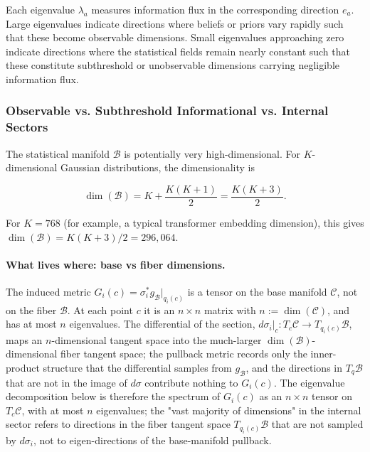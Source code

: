 \documentclass[11pt]{article}
\begin{document}
Each eigenvalue $\lambda_a$ measures information flux in the corresponding direction $e_a$. Large eigenvalues indicate directions where beliefs or priors vary rapidly such that these become observable dimensions. Small eigenvalues approaching zero indicate directions where the statistical fields remain nearly constant such that these constitute subthreshold or unobservable dimensions carrying negligible information flux.

\subsubsection{Observable vs. Subthreshold Informational vs. Internal Sectors}

The statistical manifold $\mathcal{B}$ is potentially very high-dimensional. For $K$-dimensional Gaussian distributions, the dimensionality is

\begin{equation}
\dim(\mathcal{B}) = K + \frac{K(K+1)}{2} = \frac{K(K+3)}{2}.
\end{equation}

For $K=768$ (for example, a typical transformer embedding dimension), this gives $\dim(\mathcal{B}) = K(K+3)/2 = 296{,}064$.

\paragraph{What lives where: base vs fiber dimensions.} The induced metric $G_i(c) = \sigma_i^* g_{\mathcal{B}}|_{q_i(c)}$ is a tensor on the base manifold $\mathcal{C}$, not on the fiber $\mathcal{B}$. At each point $c$ it is an $n \times n$ matrix with $n := \dim(\mathcal{C})$, and has at most $n$ eigenvalues. The differential of the section, $d\sigma_i|_c: T_c\mathcal{C} \to T_{q_i(c)}\mathcal{B}$, maps an $n$-dimensional tangent space into the much-larger $\dim(\mathcal{B})$-dimensional fiber tangent space; the pullback metric records only the inner-product structure that the differential samples from $g_{\mathcal{B}}$, and the directions in $T_q\mathcal{B}$ that are not in the image of $d\sigma$ contribute nothing to $G_i(c)$. The eigenvalue decomposition below is therefore the spectrum of $G_i(c)$ as an $n\times n$ tensor on $T_c\mathcal{C}$, with at most $n$ eigenvalues; the "vast majority of dimensions" in the internal sector refers to directions in the fiber tangent space $T_{q_i(c)}\mathcal{B}$ that are not sampled by $d\sigma_i$, not to eigen-directions of the base-manifold pullback.
\end{document}
